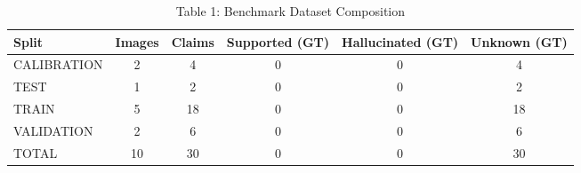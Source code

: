 \begin{table}[htbp]
\centering
\caption{Table 1: Benchmark Dataset Composition}
\label{tab:table1_dataset_composition}
\begin{tabular}{lccccc}
\hline
Split & Images & Claims & Supported (GT) & Hallucinated (GT) & Unknown (GT) \\
\hline
CALIBRATION & 2 & 4 & 0 & 0 & 4 \\
TEST & 1 & 2 & 0 & 0 & 2 \\
TRAIN & 5 & 18 & 0 & 0 & 18 \\
VALIDATION & 2 & 6 & 0 & 0 & 6 \\
TOTAL & 10 & 30 & 0 & 0 & 30 \\
\hline
\end{tabular}
\end{table}